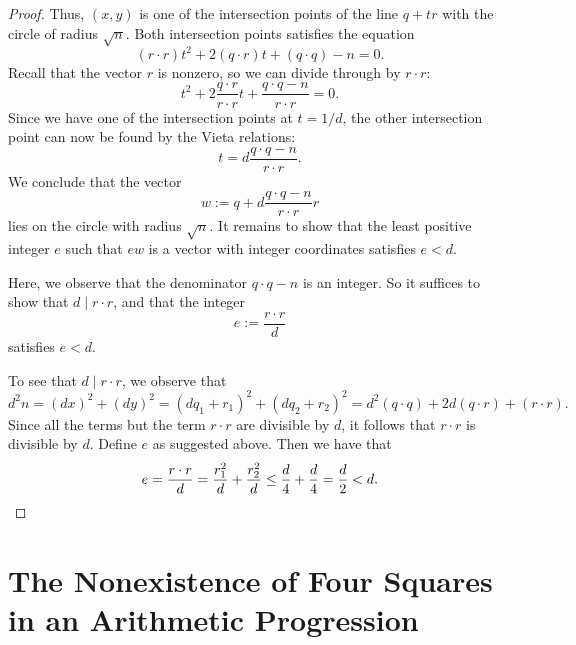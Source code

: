 \begin{proof}
  Thus, $(x,y)$ is one of the intersection points of the line $q+tr$ with the circle of radius $\sqrt{n}$. Both intersection points satisfies the equation
  \begin{equation*}
    (r\cdot r)t^2+2(q\cdot r)t+(q\cdot q)-n=0.
  \end{equation*}
  Recall that the vector $r$ is nonzero, so we can divide through by $r\cdot r$:
  \begin{equation*}
    t^2+2\frac{q\cdot r}{r\cdot r} t+\frac{q\cdot q-n}{r\cdot r}=0.
  \end{equation*}
  Since we have one of the intersection points at $t=1/d$, the other intersection point can now be found by the Vieta relations:
  \begin{equation*}
    t= d\frac{q\cdot q-n}{r\cdot r}.
  \end{equation*}
  We conclude that the vector
  \begin{equation*}
    w:= q+ d\frac{q\cdot q-n}{r\cdot r}r
  \end{equation*}
  lies on the circle with radius $\sqrt{n}$. It remains to show that the least positive integer $e$ such that $ew$ is a vector with integer coordinates satisfies $e<d$. 

  Here, we observe that the denominator $q\cdot q-n$ is an integer. So it suffices to show that $d\mid r\cdot r$, and that the integer
  \begin{equation*}
    e:= \frac{r\cdot r}{d}
  \end{equation*}
  satisfies $e<d$.

  To see that $d\mid r\cdot r$, we observe that
  \begin{equation*}
    d^2n= (dx)^2+(dy)^2=(dq_1+r_1)^2+(dq_2+r_2)^2= d^2(q\cdot q)+2d(q\cdot r)+ (r\cdot r).
  \end{equation*}
  Since all the terms but the term $r\cdot r$ are divisible by $d$, it follows that $r\cdot r$ is divisible by $d$. Define $e$ as suggested above. Then we have that
  \begin{equation*}
    e=\frac{r\cdot r}{d}=\frac{r_1^2}{d}+\frac{r_2^2}{d}\leq \frac{d}{4}+\frac{d}{4}=\frac{d}{2}<d.\qedhere
  \end{equation*}
\end{proof}

\section{The Nonexistence of Four Squares in an Arithmetic Progression}

